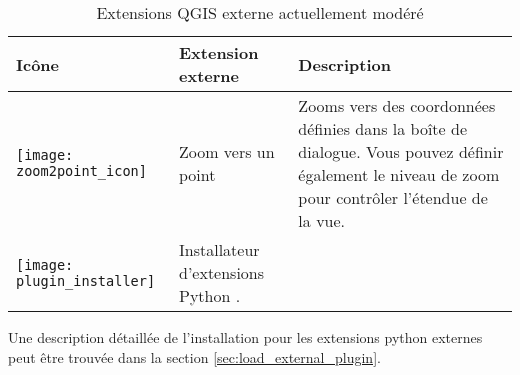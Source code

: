 \begin{table}[H]
\centering
\caption{Extensions QGIS externe actuellement modéré}\label{tab:external_plugins}\medskip
\small
 \begin{tabular}{|l|l|p{4in}|}
\hline \textbf{Icône} & \textbf{Extension externe} & \textbf{Description}\\
\hline
\texttt{[image: zoom2point\_icon]} & Zoom vers un point \index{plugins!Zoom vers un point} & Zooms vers des coordonnées définies dans la boîte de dialogue. Vous pouvez définir également le niveau de zoom pour contrôler l'étendue de la vue.\\
\hline
\texttt{[image: plugin\_installer]} & Installateur d'extensions Python \index{extensions!Installateur d'extensions}.\\
\hline
\end{tabular}
\end{table}

Une description détaillée de l'installation pour les extensions python externes peut être trouvée dans la section \ref{sec:load_external_plugin}.


